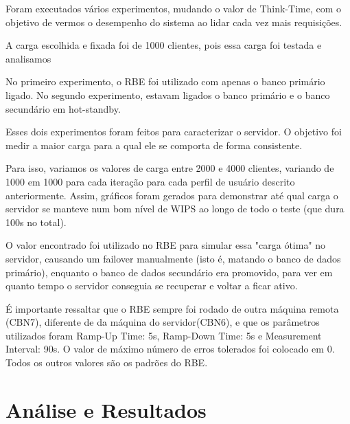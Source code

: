 \documentclass[11pt,twoside]{article}
\begin{document}
Foram executados vários experimentos, mudando o valor de Think-Time, com o objetivo de vermos o desempenho do sistema ao lidar cada vez mais requisições.

A carga escolhida e fixada foi de 1000 clientes, pois essa carga foi testada e analisamos 

No primeiro experimento, o RBE foi utilizado com apenas o banco primário ligado. No segundo experimento, estavam ligados o banco primário e o banco secundário em hot-standby.

Esses dois experimentos foram feitos para caracterizar o servidor. O objetivo foi medir a maior carga para a qual ele se comporta de forma consistente.

Para isso, variamos os valores de carga entre 2000 e 4000 clientes, variando de 1000 em 1000 para cada iteração para cada perfil de usuário descrito anteriormente. Assim,  gráficos foram gerados para demonstrar até qual carga o servidor se manteve num bom nível de WIPS ao longo de todo o teste (que dura 100s no total).

O valor encontrado foi utilizado no RBE para simular essa "carga ótima" no servidor, causando um failover manualmente (isto é, matando o banco de dados primário), enquanto o banco de dados secundário era promovido, para ver em quanto tempo o servidor conseguia se recuperar e voltar a ficar ativo.

É importante ressaltar que o RBE sempre foi rodado de outra máquina remota (CBN7), diferente de da máquina do servidor(CBN6), e que os parâmetros utilizados foram Ramp-Up Time: 5s, Ramp-Down Time: 5s e Measurement Interval: 90s. O valor de máximo número de erros tolerados foi colocado em 0. Todos os outros valores são os padrões do RBE.

\section{An\'alise e Resultados}
\setlength{\parindent}{4ex}
\end{document}
